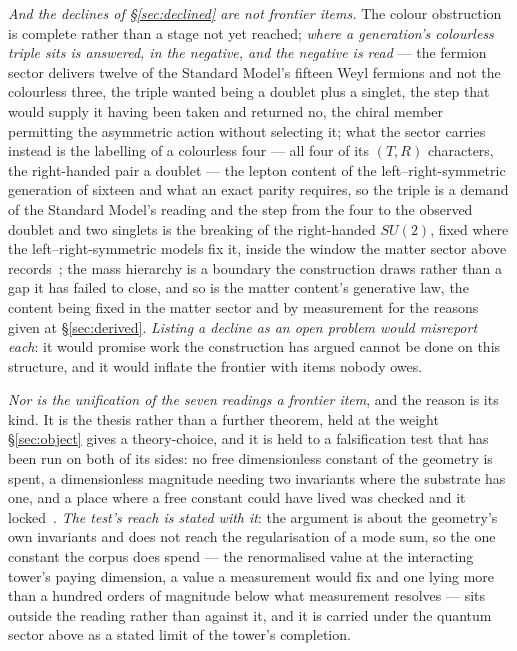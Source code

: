 \documentclass[11pt,a4paper]{article}
\theoremstyle{plain}
\theoremstyle{definition}
\begin{document}
\emph{And the declines of \S\ref{sec:declined} are not frontier items.} The colour obstruction is complete
rather than a stage not yet reached; \emph{where a generation's colourless triple sits is answered, in the
negative, and the negative is read} --- the fermion sector delivers twelve of the Standard Model's fifteen Weyl
fermions and not the colourless three, the triple wanted being a doublet plus a singlet, the step that would
supply it having been taken and returned no, the chiral member permitting the asymmetric action without selecting
it; what the sector carries instead is the labelling of a colourless four --- all four of its $(T,R)$
characters, the right-handed pair a doublet --- the lepton content of the left--right-symmetric generation of
sixteen and what an exact parity requires, so the triple is a demand of
the Standard Model's reading and the step from the four to the observed doublet and two singlets is the breaking of
the right-handed $SU(2)$, fixed where the left--right-symmetric models fix it, inside the window the matter
sector above records~\cite{JanzenMatter}; the mass hierarchy is a boundary the construction draws rather than a
gap it has failed to close, and so is the matter content's generative law, the content being fixed in the
matter sector and by measurement for the reasons given at \S\ref{sec:derived}. \emph{Listing a decline as an open problem would misreport each}: it would
promise work the construction has argued cannot be done on this structure, and it would inflate the frontier
with items nobody owes.

\emph{Nor is the unification of the seven readings a frontier item}, and the reason is its kind. It is
the thesis rather than a further theorem, held at the weight \S\ref{sec:object} gives a theory-choice, and
it is held to a falsification test that has been run on both of its sides: no free dimensionless constant of
the geometry is spent, a dimensionless magnitude needing two invariants where the substrate has one, and a
place where a free constant could have lived was checked and it locked~\cite{JanzenGeometricCore}. \emph{The test's
reach is stated with it}: the argument is about the geometry's own invariants and does not reach the
regularisation of a mode sum, so the one constant the corpus does spend --- the renormalised value at the
interacting tower's paying dimension, a value a measurement would fix and one lying more than a hundred orders of
magnitude below what measurement resolves --- sits outside the reading rather than against it, and it is carried
under the quantum sector above as a stated limit of the tower's completion.
\end{document}
